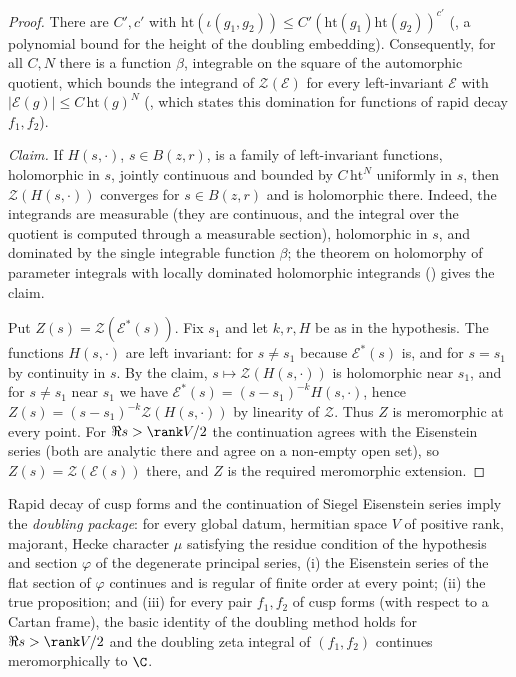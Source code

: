 \begin{proof}
There are $C',c'$ with $\mathrm{ht}(\iota(g_1,g_2))\le C'(\mathrm{ht}(g_1)\mathrm{ht}(g_2))^{c'}$
(, a polynomial bound for the height of the doubling
embedding). Consequently, for all $C,N$ there is a function $\beta$, integrable on the square of the automorphic quotient, which
bounds the integrand of $\mathcal Z(\mathcal E)$ for every left-invariant $\mathcal E$ with $|\mathcal E(g)|\le C\,\mathrm{ht}(g)^N$
(, which states this domination for functions of
rapid decay $f_1,f_2$).

\emph{Claim.} If $H(s,\cdot)$, $s\in B(z,r)$, is a family of left-invariant functions, holomorphic in $s$, jointly continuous and
bounded by $C\,\mathrm{ht}^N$ uniformly in $s$, then $\mathcal Z(H(s,\cdot))$ converges for $s\in B(z,r)$ and is holomorphic there.
Indeed, the integrands are measurable (they are continuous, and the integral over the quotient is computed through a measurable
section), holomorphic in $s$, and dominated by the single integrable function $\beta$; the theorem on holomorphy of parameter
integrals with locally dominated holomorphic integrands
() gives the claim.

Put $Z(s)=\mathcal Z(\mathcal E^*(s))$. Fix $s_1$ and let $k,r,H$ be as in the hypothesis. The functions $H(s,\cdot)$ are left
invariant: for $s\ne s_1$ because $\mathcal E^*(s)$ is, and for $s=s_1$ by continuity in $s$. By the claim, $s\mapsto\mathcal
Z(H(s,\cdot))$ is holomorphic near $s_1$, and for $s\neq s_1$ near $s_1$ we have $\mathcal E^*(s)=(s-s_1)^{-k}H(s,\cdot)$, hence
$Z(s)=(s-s_1)^{-k}\mathcal Z(H(s,\cdot))$ by linearity of $\mathcal Z$. Thus $Z$ is meromorphic at every point. For $\Re s>\rank V/2$
the continuation agrees with the Eisenstein series (both are analytic there and agree on a non-empty open set), so
$Z(s)=\mathcal Z(\mathcal E(s))$ there, and $Z$ is the required meromorphic extension.
\end{proof}

\begin{lemma}\label{pf:bundles:lem:dm}
Rapid decay of cusp forms and the continuation of Siegel Eisenstein series imply the \emph{doubling package}: for every global
datum, hermitian space $V$ of positive rank, majorant, Hecke character $\mu$ satisfying the residue condition of the hypothesis and
section $\varphi$ of the degenerate principal series, (i) the Eisenstein series of the flat section of $\varphi$ continues and is
regular of finite order at every point; (ii) the true proposition; and (iii) for every pair $f_1,f_2$ of cusp forms (with respect to a
Cartan frame), the basic identity of the doubling method holds for $\Re s>\rank V/2$ and the doubling zeta integral of $(f_1,f_2)$
continues meromorphically to $\C$.
\end{lemma}


